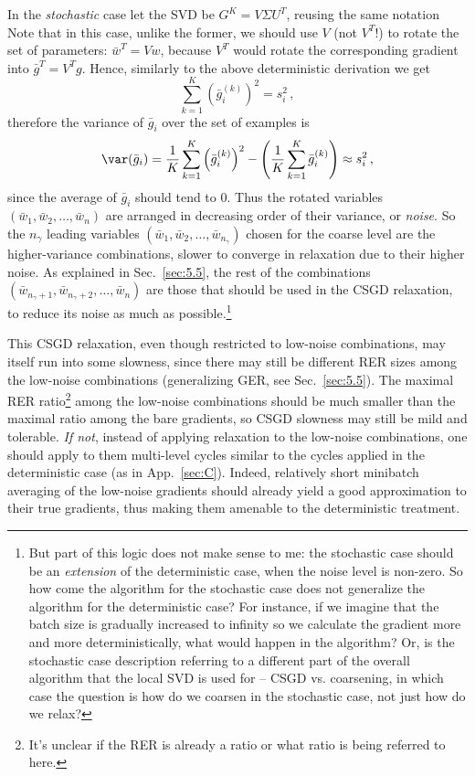 \documentclass{article} %
\begin{document}
In the {\it stochastic} case let the SVD be $G^K = V \Sigma U^T$, reusing the same notation Note that in this case, unlike the former, we should use $V$ (not $V^T$!) to rotate the set of parameters: $\bar{w}^T = V w$, because $V^T$ would rotate the corresponding gradient into $\bar{g}^T = V^T g$. Hence, similarly to the above deterministic derivation we get
$$ \sum_{k=1}^K \left(\bar{g}_i^{(k)}\right)^2 = s_i^2\,,$$
therefore the variance of $\bar{g}_i$ over the set of examples is
$$ \var(\bar{g}_i) = \frac{1}{K} \sum_{k=1}^K \left(\bar{g}_i^{(k)}\right)^2 - \left(\frac{1}{K} \sum_{k=1}^K \bar{g}_i^{(k)} \right) \approx s_i^2\,,$$
since the average of $\bar{g}_i$ should tend to $0$. Thus the rotated variables $(\bar{w}_1,\bar{w}_2,\dots,\bar{w}_n)$ are arranged in decreasing order of their variance, or {\it noise}. So the $n_{\gamma}$ leading variables $(\bar{w}_1,\bar{w}_2,\dots,\bar{w}_{n_{\gamma}})$ chosen for the coarse level are the higher-variance combinations, slower to converge in relaxation due to their higher noise. As explained in Sec.~\ref{sec:5.5}, the rest of the combinations $(\bar{w}_{n_{\gamma}+1},\bar{w}_{n_{\gamma}+2},\dots,\bar{w}_n)$ are those that should be used in the CSGD relaxation, to reduce its noise as much as possible.\footnote{But part of this logic does not make sense to me: the stochastic case should be an {\it extension} of the deterministic case, when the noise level is non-zero. So how come the algorithm for the stochastic case does not generalize the algorithm for the deterministic case? For instance, if we imagine that the batch size is gradually increased to infinity so we calculate the gradient more and more deterministically, what would happen in the algorithm? Or, is the stochastic case description referring to a different part of the overall algorithm that the local SVD is used for -- CSGD vs. coarsening, in which case the question is how do we coarsen in the stochastic case, not just how do we relax?}

This CSGD relaxation, even though restricted to low-noise combinations, may itself run into some slowness, since there may still be different RER sizes among the low-noise combinations (generalizing GER, see Sec.~\ref{sec:5.5}). The maximal RER ratio\footnote{It's unclear if the RER is already a ratio or what ratio is being referred to here.} among the low-noise combinations should be much smaller than the maximal ratio among the bare gradients, so CSGD slowness may still be mild and tolerable. {\it If not}, instead of applying relaxation to the low-noise combinations, one should apply to them multi-level cycles similar to the cycles applied in the deterministic case (as in App.~\ref{sec:C}). Indeed, relatively short minibatch averaging of the low-noise gradients should already yield a good approximation to their true gradients, thus making them amenable to the deterministic treatment.
\end{document}
